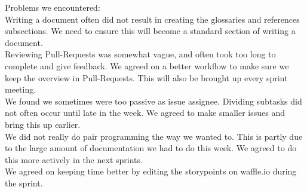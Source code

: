 \documentclass[11pt,a4paper,landscape]{article}
\begin{document}
Problems we encountered:\\
Writing a document often did not result in creating the glossaries and references subsections. We need to ensure this will become a standard section of writing a document.\\
Reviewing Pull-Requests was somewhat vague, and often took too long to complete and give feedback. We agreed on a better workflow to make sure we keep the overview in Pull-Requests. This will also be brought up every sprint meeting.\\
We found we sometimes were too passive as issue assignee. Dividing subtasks did not often occur until late in the week. We agreed to make smaller issues and bring this up earlier.\\
We did not really do pair programming the way we wanted to. This is partly due to the large amount of documentation we had to do this week. We agreed to do this more actively in the next sprints.\\
We agreed on keeping time better by editing the storypoints on waffle.io during the sprint. 
\end{document}
